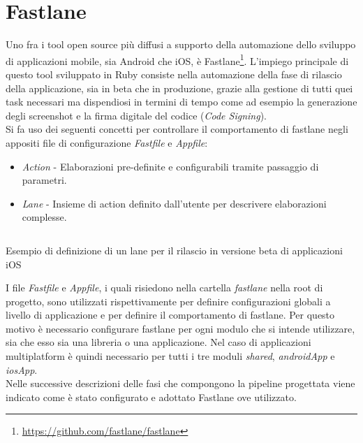 \section{Fastlane}
Uno fra i tool open source più diffusi a supporto della automazione dello sviluppo di applicazioni mobile, sia Android che iOS, è Fastlane\footnote{\url{https://github.com/fastlane/fastlane}}. L'impiego principale di questo tool sviluppato in Ruby consiste nella automazione della fase di rilascio della applicazione, sia in beta che in produzione, grazie alla gestione di tutti quei task necessari ma dispendiosi in termini di tempo come ad esempio la generazione degli screenshot e la firma digitale del codice (\textit{Code Signing}).\\
Si fa uso dei seguenti concetti per controllare il comportamento di fastlane negli appositi file di configurazione \textit{Fastfile} e \textit{Appfile}:
\begin{itemize}
    \item \textit{Action} - Elaborazioni pre-definite e configurabili tramite passaggio di parametri.
    \item \textit{Lane} - Insieme di action definito dall'utente per descrivere elaborazioni complesse.
\end{itemize}

\begin{listing}[H]
\inputminted{ruby}{code/4-fastlane}
\caption{Esempio di definizione di un lane per il rilascio in versione beta di applicazioni iOS}
\end{listing}

I file \textit{Fastfile} e \textit{Appfile}, i quali risiedono nella cartella \textit{fastlane} nella root di progetto, sono utilizzati rispettivamente per definire configurazioni globali a livello di applicazione e per definire il comportamento di fastlane. Per questo motivo è necessario configurare fastlane per ogni modulo che si intende utilizzare, sia che esso sia una libreria o una applicazione. Nel caso di applicazioni multiplatform è quindi necessario per tutti i tre moduli \textit{shared}, \textit{androidApp} e \textit{iosApp}.\\
Nelle successive descrizioni delle fasi che compongono la pipeline progettata viene indicato come è stato configurato e adottato Fastlane ove utilizzato. 